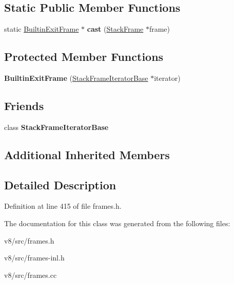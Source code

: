 \subsection*{Static Public Member Functions}
\begin{DoxyCompactItemize}
\item 
\mbox{\label{classv8_1_1internal_1_1BuiltinExitFrame_a1e4876fd5d31dbd5b40d0e52691832fd}} 
static \mbox{\hyperlink{classv8_1_1internal_1_1BuiltinExitFrame}{Builtin\+Exit\+Frame}} $\ast$ {\bfseries cast} (\mbox{\hyperlink{classv8_1_1internal_1_1StackFrame}{Stack\+Frame}} $\ast$frame)
\end{DoxyCompactItemize}
\subsection*{Protected Member Functions}
\begin{DoxyCompactItemize}
\item 
\mbox{\label{classv8_1_1internal_1_1BuiltinExitFrame_a9da58207f889f357a633ed5391d7fbd8}} 
{\bfseries Builtin\+Exit\+Frame} (\mbox{\hyperlink{classv8_1_1internal_1_1StackFrameIteratorBase}{Stack\+Frame\+Iterator\+Base}} $\ast$iterator)
\end{DoxyCompactItemize}
\subsection*{Friends}
\begin{DoxyCompactItemize}
\item 
\mbox{\label{classv8_1_1internal_1_1BuiltinExitFrame_ac7310421866976ca454bbe11c5f926c3}} 
class {\bfseries Stack\+Frame\+Iterator\+Base}
\end{DoxyCompactItemize}
\subsection*{Additional Inherited Members}


\subsection{Detailed Description}


Definition at line 415 of file frames.\+h.



The documentation for this class was generated from the following files\+:\begin{DoxyCompactItemize}
\item 
v8/src/frames.\+h\item 
v8/src/frames-\/inl.\+h\item 
v8/src/frames.\+cc\end{DoxyCompactItemize}

